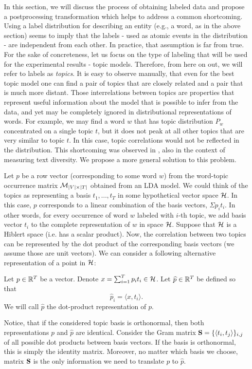 In this section, we will discuss the process of obtaining labeled
data and propose a postprocessing transformation which helps to
address a common shortcoming. Using a label distribution for
describing an entity (e.g., a word, as in 
the above section) seems to imply that the
labels - used as atomic events in the distribution - are independent
from each other. In practice, that assumption is far from true. For
the sake of concreteness, let us focus on the type of labeling that will be used for
the experimental results - topic models. Therefore, from here on out, we will
refer to labels as {\em topics}. It is easy to observe
manually, that even for the best topic model one can find a pair of
topics that are closely related and a pair that is much more
distant. Those interrelations between topics are 
properties that represent useful information about the model that is
possible to infer from the data, and yet
may be completely ignored in distributional representations of words. 
For example, we may find a word $w$ that has topic distribution $P_w$
concentrated on a single topic $t$, but it does 
not peak at all other topics that are very similar to
topic $t$. In this case, topic correlations would not be reflected in
the distribution. This shortcoming was observed in \cite{bache:2013},
also in the context of measuring text diversity. We propose a more
general solution to this problem.

Let $p$ be a row vector (corresponding to some word $w$)  from the
word-topic occurrence matrix ${\mathcal M}_{|V|\times|T|}$ obtained from an LDA
model. We could think of the topics as representing a basis
$t_1,...,t_T$ in some hypothetical vector space ${\mathcal H}$. In 
this case, $p$ corresponds to a linear combination of the basis
vectors, $\Sigma p_i t_i$. In other words, for every occurrence of
word $w$ labeled with $i$-th topic, we add basis vector $t_i$ to the
complete representation of $w$ in space ${\mathcal H}$.
Suppose that ${\mathcal H}$ is a Hiblert space (i.e. has a scalar
product). Now, the correlation between two topics can be represented
by the dot product of the corresponding basis vectors (we assume those
are unit vectors). We can consider a following alternative representation
of a point in ${\mathcal H}$:

\bed
Let $p\in{\mathbb R}^T$ be a vector. Denote $x=\sum_{i=1}^T p_i
t_i\in{\mathcal H}$. Let $\widehat{p}\in{\mathbb R}^T$ be defined so that
\[\widehat{p}_i = \langle x,t_i\rangle.\]
We will call $\widehat{p}$ the dot-product representation of $p$.
\eed

Notice, that if the considered topic basis is orthonormal, then both
representations $p$ and $\widehat{p}$ are identical. Consider the Gram matrix
$\operatorname{\mathbf{S}}=\{\langle t_i,t_j\rangle\}_{i,j}$ of all possible dot products between
basis vectors. If the basis is orthonormal, this is simply the identity
matrix. Moreover, no matter which basis we choose, matrix $\operatorname{\mathbf{S}}$ is the
only information we need to translate $p$ to $\widehat{p}$.

